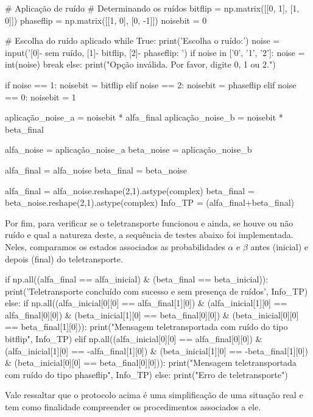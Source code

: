 \begin{pycode}
  # Aplicação de ruído
  # Determinando os ruídos
  bitflip = np.matrix([[0, 1], [1, 0]])
  phaseflip = np.matrix([[1, 0], [0, -1]])
  noisebit = 0

  # Escolha do ruído aplicado
  while True:
      print('Escolha o ruído:')
      noise = input('[0]- sem ruído, [1]- bitflip, [2]- phaseflip: ')
      if noise in ['0', '1', '2']:
          noise = int(noise)
          break
      else:
          print("Opção inválida. Por favor, digite 0, 1 ou 2.")

  if noise == 1:
      noisebit = bitflip
  elif noise == 2:
      noisebit = phaseflip
  elif noise == 0:
      noisebit = 1

  aplicação_noise_a = noisebit * alfa_final
  aplicação_noise_b = noisebit * beta_final

  alfa_noise = aplicação_noise_a
  beta_noise = aplicação_noise_b

  alfa_final = alfa_noise
  beta_final = beta_noise

  alfa_final = alfa_noise.reshape(2,1).astype(complex)
  beta_final = beta_noise.reshape(2,1).astype(complex)
  Info_TP = (alfa_final+beta_final)
\end{pycode}

Por fim, para verificar se o teletransporte funcionou e ainda, se houve ou não ruído e qual a natureza deste, a sequência de testes abaixo foi implementada. Neles, comparamos os estados associados as probabilidades \(\alpha\) e \(\beta\) antes (inicial) e depois (final) do teletransporte.

\begin{pycode}
    if np.all((alfa_final == alfa_inicial) & (beta_final == beta_inicial)):
        print('Teletransporte concluído com sucesso e sem presença de ruídos', Info_TP)
    else:
        if np.all((alfa_inicial[0][0] == alfa_final[1][0]) &
                    (alfa_inicial[1][0] == alfa_final[0][0]) &
                    (beta_inicial[1][0] == beta_final[0][0]) &
                    (beta_inicial[0][0] == beta_final[1][0])):
            print("Mensagem teletransportada com ruído do tipo bitflip", Info_TP)
        elif np.all((alfa_inicial[0][0] == alfa_final[0][0]) &
                    (alfa_inicial[1][0] == -alfa_final[1][0]) &
                    (beta_inicial[1][0] == -beta_final[1][0]) &
                    (beta_inicial[0][0] == beta_final[0][0])):
            print("Mensagem teletransportada com ruído do tipo phaseflip", Info_TP)
        else:
            print("Erro de teletransporte")
\end{pycode}

Vale ressaltar que o protocolo acima é uma simplificação de uma situação real e tem como finalidade compreender os procedimentos associados a ele.

